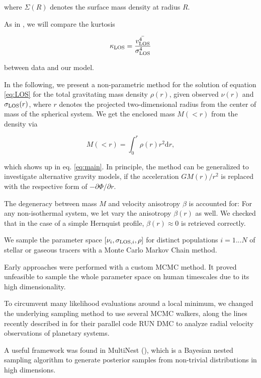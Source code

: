 where $\Sigma(R)$ denotes the surface mass density at radius $R$. 

As in \cite{Lokas+2005}, we will compare the kurtosis

\begin{equation*}
\kappa_{\rm LOS}=\frac{\bar{v_{\rm LOS}^4}}{\sigma_{\rm LOS}^4}
\end{equation*}

between data and our model.

In the following, we present a non-parametric method for the
solution of equation \ref{eq:LOS} for the total gravitating mass
density $\rho(r)$, given observed $\nu(r)$ and $\sigma_{\text{LOS}}(r)$, where $r$
denotes the projected two-dimensional radius from the center of mass
of the spherical system. We get the enclosed mass $M(<r)$ from the
density via

\begin{equation}
M(<r) = \int_0^r \rho(r) r^2 \text{d}r,
\end{equation}

which shows up in eq. \ref{eq:main}. In principle, the method can be
generalized to investigate alternative gravity models, if the
acceleration $GM(r)/r^2$ is replaced with the respective form of
$-\partial\Phi/\partial r$.

The degeneracy between mass $M$ and velocity anisotropy $\beta$ is
accounted for: For any non-isothermal system, we let vary the
anisotropy $\beta(r)$ as well. We checked that in the case of a simple
Hernquist profile, $\beta(r)\approx0$ is retrieved correctly.

We sample the parameter space $[\nu_i, \sigma_{\text{LOS},i}, \rho]$ for distinct
populations $i=1...N$ of stellar or gaseous tracers with a Monte Carlo Markov Chain method.

Early approaches were performed with a custom MCMC method. It proved
unfeasible to sample the whole parameter space on human timescales due
to its high dimensionality.

To circumvent many likelihood evaluations around a local minimum, we
changed the underlying sampling method to use several MCMC walkers,
along the lines recently described in \citep{Nelson+2013} for their
parallel code RUN DMC to analyze radial velocity observations of
planetary systems.

A useful framework was found in MultiNest (\cite{Feroz+2009}), which
is a Bayesian nested sampling algorithm to generate posterior samples
from non-trivial distributions in high dimensions.

